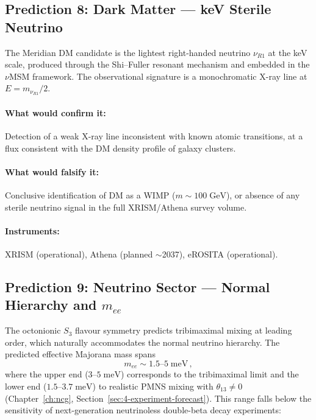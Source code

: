 \subsection{Prediction 8: Dark Matter --- keV Sterile Neutrino}
\label{sec:2-pred8}

The Meridian DM candidate is the lightest right-handed neutrino $\nu_{R1}$ at the keV scale, produced through the Shi--Fuller resonant mechanism and embedded in the $\nu$MSM framework. The observational signature is a monochromatic X-ray line at $E = m_{\nu_{R1}}/2$.

\paragraph{What would confirm it:} Detection of a weak X-ray line inconsistent with known atomic transitions, at a flux consistent with the DM density profile of galaxy clusters.

\paragraph{What would falsify it:} Conclusive identification of DM as a WIMP ($m \sim 100\;\mathrm{GeV}$), or absence of any sterile neutrino signal in the full XRISM/Athena survey volume.

\paragraph{Instruments:} XRISM (operational), Athena (planned $\sim$2037), eROSITA (operational).

\subsection{Prediction 9: Neutrino Sector --- Normal Hierarchy and $m_{ee}$}
\label{sec:2-pred9}

The octonionic $S_3$ flavour symmetry predicts tribimaximal mixing at leading order, which naturally accommodates the normal neutrino hierarchy. The predicted effective Majorana mass spans
\begin{equation}
m_{ee} \sim 1.5\text{--}5\;\mathrm{meV}\,,
\end{equation}
where the upper end ($3$--$5\;\mathrm{meV}$) corresponds to the tribimaximal limit and the lower end ($1.5$--$3.7\;\mathrm{meV}$) to realistic PMNS mixing with $\theta_{13} \neq 0$ (Chapter~\ref{ch:ncg}, Section~\ref{sec:4-experiment-forecast}). This range falls below the sensitivity of next-generation neutrinoless double-beta decay experiments:

